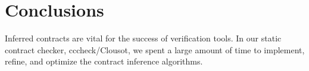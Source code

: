 \documentclass{sig-alternate-2013}
\begin{document}
\section{Conclusions}
Inferred contracts are vital for the success of verification tools.
In our static contract checker, cccheck/Clousot, we spent a large amount of time to implement, refine, and optimize the contract inference algorithms.

\vfill\eject 


%
%
\end{document}
